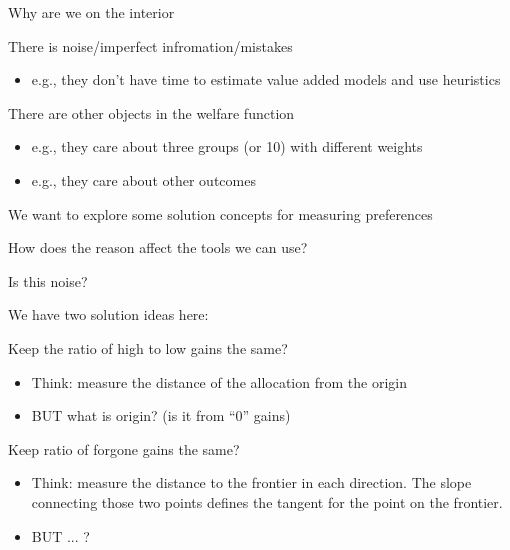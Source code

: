 \documentclass[t,aspectratio=169,11pt,presentation]{beamer}
\newenvironment{wideitemize}{\itemize\addtolength{\itemsep}{14pt}}{\enditemize}
\begin{document}

\begin{frame}{Why are we on the interior}
    
    \begin{wideitemize}
        \item There is noise/imperfect infromation/mistakes
        \begin{itemize}
            \item e.g., they don't have time to estimate value added models and use heuristics
        \end{itemize}
        \item There are other objects in the welfare function
        \begin{itemize}
            \item e.g., they care about three groups (or 10) with different weights
            \item e.g., they care about other outcomes 
        \end{itemize}
        \item We want to explore some solution concepts for measuring preferences
        \item How does the reason affect the tools we can use?
    \end{wideitemize}    
    \end{frame}




   \begin{frame}{Is this noise? }
    \begin{wideitemize}
        \item We have two solution ideas here:
       \item Keep the ratio of high to low gains the same? 
       \begin{itemize}
            \item Think: measure the  distance of the allocation from the origin
           \item BUT what is origin? (is it from ``0'' gains)
       \end{itemize}
       
       \item Keep ratio of forgone gains the same?
       \begin{itemize}
           \item Think: measure the distance to the frontier in each direction. The slope connecting those two points defines the tangent for the point on the frontier. 
           \item BUT ... ?
       \end{itemize}
    \end{wideitemize}    
    \end{frame}
    
\end{document}
